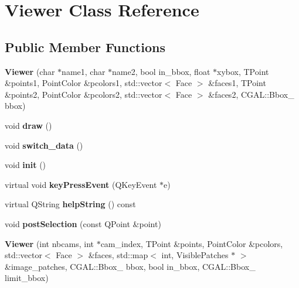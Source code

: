 \hypertarget{classViewer}{
\section{Viewer Class Reference}
\label{classViewer}
}
\subsection*{Public Member Functions}
\begin{DoxyCompactItemize}
\item 
\hypertarget{classViewer_aa20cb38f0d3ed152d188f9dd9116656d}{
{\bfseries Viewer} (char $\ast$name1, char $\ast$name2, bool in\_\-bbox, float $\ast$xybox, TPoint \&points1, PointColor \&pcolors1, std::vector$<$ Face $>$ \&faces1, TPoint \&points2, PointColor \&pcolors2, std::vector$<$ Face $>$ \&faces2, CGAL::Bbox\_ bbox)}
\label{classViewer_aa20cb38f0d3ed152d188f9dd9116656d}

\item 
\hypertarget{classViewer_a9ce9d06343c4e089ac76b19f78fe29e4}{
void {\bfseries draw} ()}
\label{classViewer_a9ce9d06343c4e089ac76b19f78fe29e4}

\item 
\hypertarget{classViewer_a0229d79ea777ccc5eb4cc46f90de553d}{
void {\bfseries switch\_\-data} ()}
\label{classViewer_a0229d79ea777ccc5eb4cc46f90de553d}

\item 
\hypertarget{classViewer_a255cc2d6f55fc8565e614618d41589b1}{
void {\bfseries init} ()}
\label{classViewer_a255cc2d6f55fc8565e614618d41589b1}

\item 
\hypertarget{classViewer_a151e08b88af52eb4a1b80de42b5c6d8e}{
virtual void {\bfseries keyPressEvent} (QKeyEvent $\ast$e)}
\label{classViewer_a151e08b88af52eb4a1b80de42b5c6d8e}

\item 
\hypertarget{classViewer_a1f056d8d3c4e38d22f8ec52e9bd5a5d3}{
virtual QString {\bfseries helpString} () const }
\label{classViewer_a1f056d8d3c4e38d22f8ec52e9bd5a5d3}

\item 
\hypertarget{classViewer_aed885858645c43559de13e29ec0735a5}{
void {\bfseries postSelection} (const QPoint \&point)}
\label{classViewer_aed885858645c43559de13e29ec0735a5}

\item 
\hypertarget{classViewer_a573feb8d0dbfa4a9b2050af107b8b728}{
{\bfseries Viewer} (int nbcams, int $\ast$cam\_\-index, TPoint \&points, PointColor \&pcolors, std::vector$<$ Face $>$ \&faces, std::map$<$ int, VisiblePatches $\ast$ $>$ \&image\_\-patches, CGAL::Bbox\_ bbox, bool in\_\-bbox, CGAL::Bbox\_ limit\_\-bbox)}
\label{classViewer_a573feb8d0dbfa4a9b2050af107b8b728}


\end{DoxyCompactItemize}
